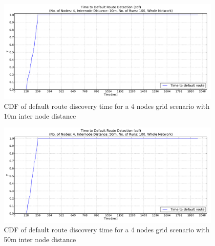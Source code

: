 \begin{figure}[htbp]
  \begin{center}
    \leavevmode
      \includegraphics[width=\textwidth]
      {Pics/results/4/MRHOF/grid/dist10_montecarlo_cdf_hist.pdf}
   \caption{CDF of default route discovery time for a 4 nodes grid scenario with 10m inter node distance}
   \label{fig:4_MRHOF_grid_10_cdf}
  \end{center}
\end{figure}

\begin{figure}[htbp]
  \begin{center}
    \leavevmode
      \includegraphics[width=\textwidth]
      {Pics/results/4/MRHOF/grid/dist50_montecarlo_cdf_hist.pdf}
   \caption{CDF of default route discovery time for a 4 nodes grid scenario with 50m inter node distance}
   \label{fig:4_MRHOF_grid_50_cdf}
  \end{center}
\end{figure}

